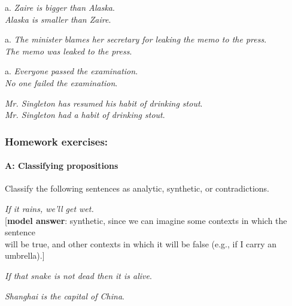 \begin{stylepoints}
\ea%
    \label{ex:key:2}



          a. \textit{Zaire is bigger than Alaska}.\\
\ex \textit{Alaska is smaller than Zaire}.
\z
\end{stylepoints}

\begin{stylepoints}
\ea%
    \label{ex:key:3}

          a. \textit{The minister blames her secretary for leaking the memo to the press}.\\
\ex \textit{The memo was leaked to the press}.
\z
\end{stylepoints}

\begin{stylepoints}
\ea%
    \label{ex:key:4}
  
          a. \textit{Everyone passed the examination}.\\
\ex \textit{No one failed the examination}.
\z
\end{stylepoints}

\begin{stylepoints}
\ea%
    \label{ex:key:5}
\textit{Mr. Singleton has resumed his habit of drinking stout}.\\
\ex \textit{Mr. Singleton had a habit of drinking stout}.
    \z
\end{stylepoints}

\subsubsection{Homework exercises:}\label{sec:}
\paragraph{A: Classifying propositions}

Classify the following sentences as analytic, synthetic, or contradictions.

\ea
\ea \textit{If it rains, we’ll get wet.}\\
  {}[\textbf{model answer}: synthetic, since we can imagine some contexts in which the sentence\\
  will be true, and other contexts in which it will be false (e.g., if I carry an umbrella).]

\ex \textit{If that snake is not dead then it is alive}.

\ex \textit{Shanghai is the capital of China}.

